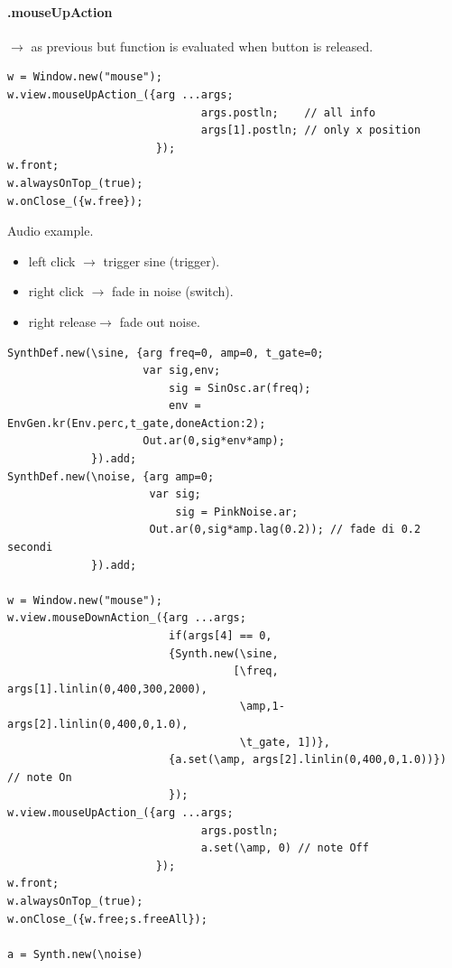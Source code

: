 \paragraph{.mouseUpAction} \(\rightarrow\) as previous but function is evaluated when button is released.

\begin{lstlisting}[frame=single, caption=mouseUpAction model] 
w = Window.new("mouse");
w.view.mouseUpAction_({arg ...args;
                              args.postln;    // all info
                              args[1].postln; // only x position
                       });
w.front;
w.alwaysOnTop_(true);
w.onClose_({w.free});
\end{lstlisting} 

Audio example.

\begin{itemize}
\tightlist
\item left click $\rightarrow$ trigger sine (trigger).
\item right click $\rightarrow$ fade in noise (switch).
\item right release$\rightarrow$ fade out noise.
\end{itemize}

\begin{lstlisting}[frame=single] 
SynthDef.new(\sine, {arg freq=0, amp=0, t_gate=0;
                     var sig,env;
                         sig = SinOsc.ar(freq);
                         env = EnvGen.kr(Env.perc,t_gate,doneAction:2);
                     Out.ar(0,sig*env*amp);
             }).add;
SynthDef.new(\noise, {arg amp=0;
                      var sig;
                          sig = PinkNoise.ar;
                      Out.ar(0,sig*amp.lag(0.2)); // fade di 0.2 secondi
             }).add;

w = Window.new("mouse");
w.view.mouseDownAction_({arg ...args;
                         if(args[4] == 0,
                         {Synth.new(\sine,
                                   [\freq, args[1].linlin(0,400,300,2000),
                                    \amp,1-args[2].linlin(0,400,0,1.0),
                                    \t_gate, 1])}, 
		                 {a.set(\amp, args[2].linlin(0,400,0,1.0))}) // note On                      
                         });
w.view.mouseUpAction_({arg ...args;
                              args.postln;
                              a.set(\amp, 0) // note Off                             
                       });
w.front;
w.alwaysOnTop_(true);
w.onClose_({w.free;s.freeAll});

a = Synth.new(\noise)
\end{lstlisting} 

